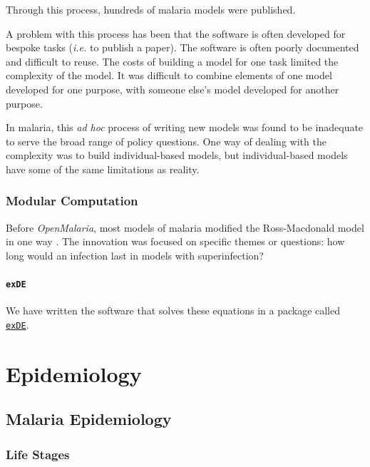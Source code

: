 \documentclass[
]{book}
\begin{document}
Through this process, hundreds of malaria models were published.

A problem with this process has been that the software is often developed for bespoke tasks (\emph{i.e.} to publish a paper). The software is often poorly documented and difficult to reuse. The costs of building a model for one task limited the complexity of the model. It was difficult to combine elements of one model developed for one purpose, with someone else's model developed for another purpose.

In malaria, this \emph{ad hoc} process of writing new models was found to be inadequate to serve the broad range of policy questions. One way of dealing with the complexity was to build individual-based models, but individual-based models have some of the same limitations as reality.

\section{Modular Computation}\label{modular-computation}

Before \emph{OpenMalaria}, most models of malaria modified the Ross-Macdonald model in one way \autocite{ReinerRC2013SystematicReview}. The innovation was focused on specific themes or questions: how long would an infection last in models with superinfection?

\subsection{\texorpdfstring{\texttt{exDE}}{exDE}}\label{exde}

We have written the software that solves these equations in a package called \href{https://cran.r-project.org/web/packages/exDE/index.html}{\texttt{exDE}}.

\part{Epidemiology}\label{part-epidemiology}

\chapter{Malaria Epidemiology}\label{malaria-epidemiology-2}

\section{Life Stages}\label{life-stages}
\end{document}
